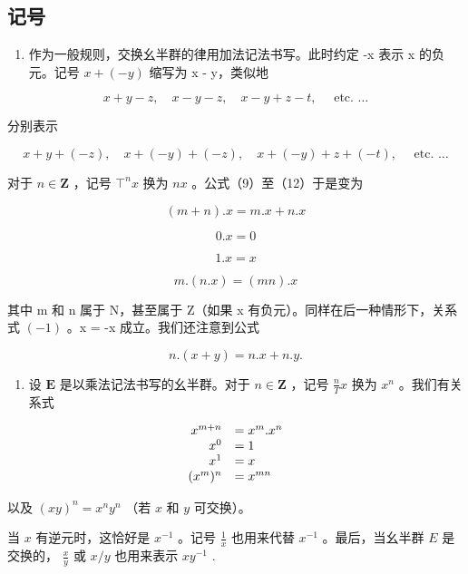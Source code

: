 \subsection{记号}

\begin{enumerate}
\def\labelenumi{(\alph{enumi})}
\tightlist
\item
  作为一般规则，交换幺半群的律用加法记法书写。此时约定 -x 表示 x 的负元。记号 \(x + (-y)\) 缩写为 x - y，类似地
\end{enumerate}

\[
x + y - z, \quad x - y - z, \quad x - y + z - t, \quad \text { etc. } \dots
\]

分别表示

\[
x + y + (- z), \quad x + (- y) + (- z), \quad x + (- y) + z + (- t), \quad \text { etc. } \dots
\]

对于 \(n \in \mathbf{Z}\) ，记号 \(\top^n x\) 换为 \(nx\) 。公式（9）至（12）于是变为

\[
(m + n). x = m. x + n. x\tag{13}
\]

\[
0. x = 0\tag{14}
\]

\[
1. x = x\tag{15}
\]

\[
m. (n. x) = (m n). x\tag{16}
\]

其中 m 和 n 属于 N，甚至属于 Z（如果 x 有负元）。同样在后一种情形下，关系式 \((-1)\) 。x = -x 成立。我们还注意到公式

\[
n. (x + y) = n. x + n. y.\tag{17}
\]

\begin{enumerate}
\def\labelenumi{(\alph{enumi})}
\setcounter{enumi}{1}
\tightlist
\item
  设 \(\mathbf{E}\) 是以乘法记法书写的幺半群。对于 \(n \in \mathbf{Z}\) ，记号 \(\frac{n}{T} x\) 换为 \(x^n\) 。我们有关系式
\end{enumerate}

\[
\begin{array}{r l} x ^ {m + n} & = x ^ {m}. x ^ {n} \\ x ^ {0} & = 1 \\ x ^ {1} & = x \\ (x ^ {m}) ^ {n} & = x ^ {m n} \end{array}
\]

以及 \((xy)^n = x^n y^n\) （若 \(x\) 和 \(y\) 可交换）。

当 \(x\) 有逆元时，这恰好是 \(x^{-1}\) 。记号 \(\frac{1}{x}\) 也用来代替 \(x^{-1}\) 。最后，当幺半群 \(E\) 是交换的， \(\frac{x}{y}\) 或 \(x / y\) 也用来表示 \(xy^{-1}\) .

